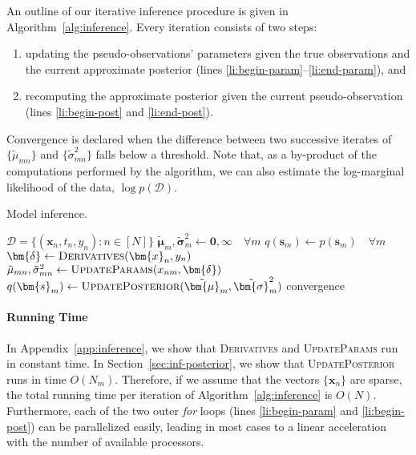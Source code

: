 An outline of our iterative inference procedure is given in Algorithm~\ref{alg:inference}.
Every iteration consists of two steps:
\begin{enumerate}
\item updating the pseudo-observations' parameters given the true observations and the current approximate posterior (lines \ref{li:begin-param}--\ref{li:end-param}), and
\item recomputing the approximate posterior given the current pseudo-observation (lines \ref{li:begin-post} and \ref{li:end-post}).
\end{enumerate}
Convergence is declared when the difference between two successive iterates of $\{ \tilde{\mu}_{mn} \}$ and $\{ \tilde{\sigma}_{mn}^2 \}$ falls below a threshold.
Note that, as a by-product of the computations performed by the algorithm, we can also estimate the log-marginal likelihood of the data, $\log p(\mathcal{D})$.

\begin{algorithm}[t]
  \caption{Model inference.}
  \label{alg:inference}
  \begin{algorithmic}[1]
    \Require $\mathcal{D} = \{ (\bm{x}_n, t_n, y_n) : n \in [N] \}$
    \State $\tilde{\bm{\mu}}_m, \tilde{\bm{\sigma}}^2_m \gets \bm{0}, \bm{\infty} \quad \forall m$
    \State $q(\bm{s}_m) \gets p(\bm{s}_m) \quad \forall m$
    \Repeat
        \label{li:begin-param}
        \State $\bm{\delta} \gets \textsc{Derivatives}(\bm{x}_n, y_n)$ \label{li:derivatives}
          \State $\tilde{\mu}_{mn}, \tilde{\sigma}^2_{mn} \gets \textsc{UpdateParams}(x_{nm}, \bm{\delta})$ \label{li:updateparams}
        \EndFor
      \EndFor \label{li:end-param}
       \label{li:begin-post}
        \State $q(\bm{s}_m) \gets \textsc{UpdatePosterior}(\tilde{\bm{\mu}}_m, \tilde{\bm{\sigma}}^2_m)$ \label{li:updateposterior}
      \EndFor \label{li:end-post}
    \Until convergence
  \end{algorithmic}
\end{algorithm}

\paragraph{Running Time}
In Appendix~\ref{app:inference}, we show that \textsc{Derivatives} and \textsc{UpdateParams} run in constant time.
In Section~\ref{sec:inf-posterior}, we show that \textsc{UpdatePosterior} runs in time $O(N_m)$.
Therefore, if we assume that the vectors $\{ \bm{x}_n \}$ are sparse, the total running time per iteration of Algorithm~\ref{alg:inference} is $O(N)$.
Furthermore, each of the two outer \emph{for} loops (lines \ref{li:begin-param} and \ref{li:begin-post}) can be parallelized easily, leading in most cases to a linear acceleration with the number of available processors.


